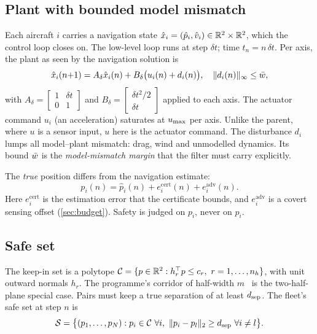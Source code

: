 \subsection{Plant with bounded model mismatch}
Each aircraft $i$ carries a navigation state
$\hat x_i=(\hat p_i,\hat v_i)\in\mathbb{R}^2\times\mathbb{R}^2$, which the control loop closes
on. The low-level loop runs at step $\delta t$; time $t_n=n\,\delta t$. Per
axis, the plant as seen by the navigation solution is
\begin{equation}\label{eq:plant}
\hat x_i(n{+}1)=A_\delta \hat x_i(n)+B_\delta\bigl(u_i(n)+d_i(n)\bigr),\quad \|d_i(n)\|_\infty\le\bar w,
\end{equation}
with $A_\delta=\left[\begin{smallmatrix}1&\delta t\\0&1\end{smallmatrix}\right]$ and
$B_\delta=\left[\begin{smallmatrix}\delta t^2/2\\\delta t\end{smallmatrix}\right]$ applied
to each axis. The actuator command $u_i$ (an acceleration) saturates at
$u_{\max}$ per axis. Unlike the parent, where $u$ is a sensor input, $u$ here is
the actuator command. The disturbance $d_i$ lumps all model--plant mismatch:
drag, wind and unmodelled dynamics. Its bound $\bar w$ is the
\emph{model-mismatch margin} that the filter must carry explicitly.

The \emph{true} position differs from the navigation estimate:
\begin{equation}\label{eq:truepos}
p_i(n)=\hat p_i(n)+e_i^{\mathrm{cert}}(n)+e_i^{\mathrm{adv}}(n).
\end{equation}
Here $e_i^{\mathrm{cert}}$ is the estimation error that the certificate bounds,
and $e_i^{\mathrm{adv}}$ is a covert sensing offset (\cref{sec:budget}). Safety is
judged on $p_i$, never on $\hat p_i$.

\subsection{Safe set}
The keep-in set is a polytope $\Cset=\{p\in\R^2: h_r^\top p\le c_r,\ r=1,\dots,n_h\}$,
with unit outward normals $h_r$. The programme's corridor of half-width
$m$~\cite{parentpaper} is the two-half-plane special case. Pairs must keep a
true separation of at least $d_{\mathrm{sep}}$. The fleet's safe set at step $n$ is
\begin{equation}\label{eq:safe}
\mathcal S=\bigl\{(p_1,\dots,p_N): p_i\in\Cset\ \forall i,\ \|p_i-p_l\|_2\ge\dsep\ \forall i\neq l\bigr\}.
\end{equation}

